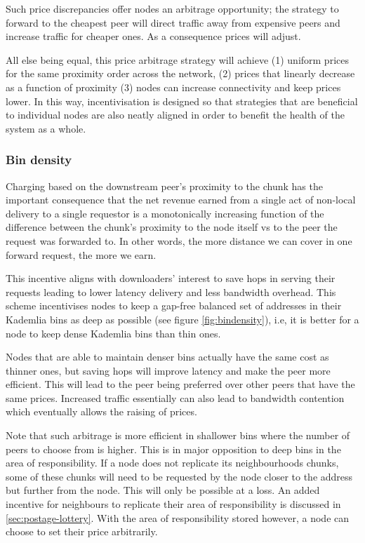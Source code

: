 Such price discrepancies offer nodes an arbitrage opportunity; the strategy to forward to the cheapest peer will direct traffic away from expensive peers and increase traffic for cheaper ones. As a consequence prices will adjust. 

All else being equal, this price arbitrage strategy will achieve (1) uniform prices for the same proximity order across the network, (2) prices that linearly decrease as a function of proximity (3) nodes can increase connectivity and keep prices lower. In this way, incentivisation is designed so that strategies that are beneficial to individual nodes are also neatly aligned in order to benefit the health of the system as a whole.


\subsubsection{Bin density}

Charging based on the downstream peer's proximity to the chunk has the important consequence that the net revenue earned from a single act of non-local delivery to a single requestor is a monotonically increasing function of the difference between the chunk's proximity to the node itself vs to the peer the request was forwarded to. In other words, the more distance we can cover in one forward request, the more we earn. 

This incentive aligns with downloaders' interest to save hops in serving their requests leading to lower latency delivery and less bandwidth overhead. This scheme incentivises nodes to keep a gap-free balanced set of addresses in their Kademlia bins as deep as possible (see figure \ref{fig:bindensity}), i.e, it is better for a node to keep dense Kademlia bins than thin ones.


Nodes that are able to maintain denser bins actually have the same cost as thinner ones, but saving hops will improve latency and make the peer more efficient. This will lead to the peer being preferred over other peers that have the same prices. Increased traffic essentially can also lead to bandwidth contention which eventually allows the raising of prices. 

Note that such arbitrage is more efficient in shallower bins where the number of peers to choose from is higher. This is in major opposition to deep bins in the area of responsibility. If a node does not replicate its neighbourhoods chunks, some of these chunks will need to be requested by the node closer to the address but further from the node. This will only be possible at a loss. An added incentive for neighbours to replicate their area of responsibility is discussed in \ref{sec:postage-lottery}. With the area of responsibility stored however, a node can choose to set their price arbitrarily. 


